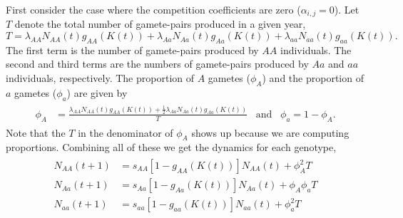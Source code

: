 \documentclass[11pt]{article}
\begin{document}
First consider the case where the competition coefficients are zero ($\alpha_{i,j}=0$).  Let $T$ denote the total number of gamete-pairs produced in a given year,
\begin{equation}
T = \lambda_{AA}N_{AA}(t)g_{AA}(K(t))+ \lambda_{Aa}N_{Aa}(t)g_{Aa}(K(t))+\lambda_{aa}N_{aa}(t)g_{aa}(K(t)).
\end{equation}
The first term is the number of gamete-pairs produced by $AA$ individuals.  The second and third terms are the numbers of gamete-pairs produced by $Aa$ and $aa$ individuals, respectively. The proportion of $A$ gametes ($\phi_A$) and the proportion of $a$ gametes ($\phi_a$) are given by
\begin{align}\begin{split}
\phi_{A} &= \frac{\lambda_{AA}N_{AA}(t)g_{AA}(K(t))+ \frac{1}{2}\lambda_{Aa}N_{Aa}(t)g_{Aa}(K(t))}{T} \hspace{10pt} \text{and} \hspace{10pt} \phi_a = 1-\phi_{A}.
\end{split}\end{align}
Note that the $T$ in the denominator of $\phi_A$ shows up because we are computing proportions.  Combining all of these we get the dynamics for each genotype,
\begin{align}\begin{split}
N_{AA}(t+1) &= s_{AA}[1-g_{AA}(K(t))]N_{AA}(t) + \phi_A^2T\\
N_{Aa}(t+1) &= s_{Aa}[1-g_{Aa}(K(t))]N_{Aa}(t) + \phi_A\phi_aT\\
N_{aa}(t+1) &= s_{aa}[1-g_{aa}(K(t))]N_{aa}(t) + \phi_a^2T
\end{split}\end{align}
\end{document}
